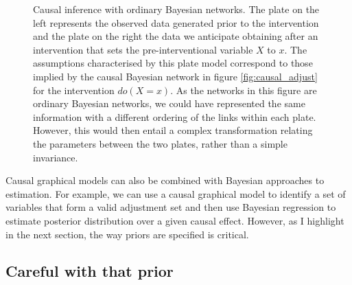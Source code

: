\documentclass[11pt,a4paper,twoside]{report}
\theoremstyle{plain}
\theoremstyle{definition}
\begin{document}
\begin{figure}[ht]
\center
{} 
\caption{Causal inference with ordinary Bayesian networks. The plate on the left represents the observed data generated prior to the intervention and the plate on the right the data we anticipate obtaining after an intervention that sets the pre-interventional variable $X$ to $x$. The assumptions characterised by this plate model correspond to those implied by the causal Bayesian network in figure \ref{fig:causal_adjust} for the intervention $do(X=x)$. As the networks in this figure are ordinary Bayesian networks, we could have represented the same information with a different ordering of the links within each plate. However, this would then entail a complex transformation relating the parameters between the two plates, rather than a simple invariance.}
\label{fig:causal_ordinary_bayes}
\end{figure}

Causal graphical models can also be combined with Bayesian approaches to estimation. For example, we can use a causal graphical model to identify a set of variables that form a valid adjustment set and then use Bayesian regression to estimate posterior distribution over a given causal effect. However, as I highlight in the next section, the way priors are specified is critical.

\subsection{Careful with that prior}
\end{document}
